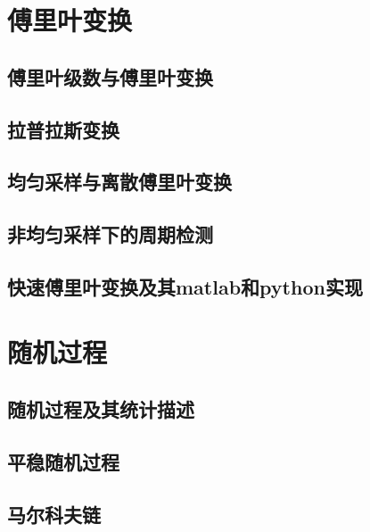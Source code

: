 \chapter{傅里叶变换}
\section{傅里叶级数与傅里叶变换}

\section{拉普拉斯变换}

\section{均匀采样与离散傅里叶变换}

\section{非均匀采样下的周期检测}

\section{快速傅里叶变换及其matlab和python实现}


\chapter{随机过程}
\section{随机过程及其统计描述}

\section{平稳随机过程}

\section{马尔科夫链}

